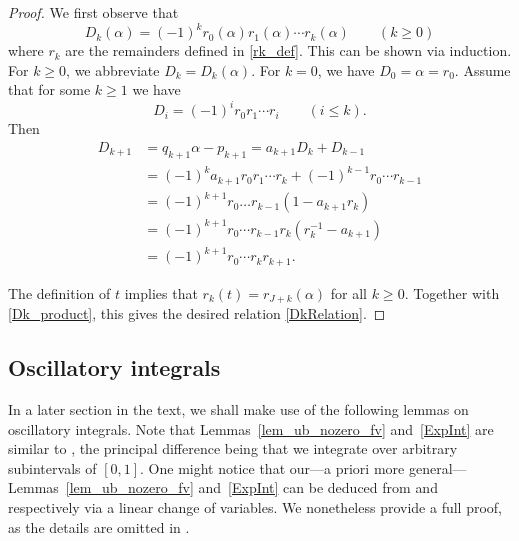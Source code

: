 \documentclass[12pt, reqno]{amsart}
\theoremstyle{definition}
\theoremstyle{remark}
\numberwithin{equation}{section}
\def\alp{{\alpha}} \def\bfalp{{\boldsymbol \alpha}}
\def\ls{\leqslant} \def\gs{\geqslant}
\begin{document}
\begin{proof}
We first observe that   
\begin{equation} \label{Dk_product}
D_k(\alp) = (-1)^k r_0(\alp) r_1(\alp) \cdots r_k(\alp) \qquad (k\gs 0)
\end{equation}
where $r_k$ are the remainders defined in \eqref{rk_def}. This can be shown via induction. For $k \ge 0$, we abbreviate $D_k = D_k(\alp)$. For $k=0$, we have $D_0 = \alp = r_0.$ Assume that for some $k\gs 1$ we have 
\[ 
D_i = (-1)^i r_0 r_1 \cdots r_i \qquad (i\ls k).   
\] 
Then 
\begin{align*}
D_{k+1} 
&= q_{k+1}\alp - p_{k+1} = a_{k+1}D_{k} + D_{k-1}
\\&= (-1)^ka_{k+1}r_0r_1\cdots r_k 
+ (-1)^{k-1}r_0\cdots r_{k-1} 
\\&= (-1)^{k+1} r_0\ldots r_{k-1}
(1- a_{k+1}r_k) 
\\ &= (-1)^{k+1} 
r_0\cdots r_{k-1}r_k(r_k^{-1}
- a_{k+1}) 
\\ &= (-1)^{k+1}
r_0\cdots r_k r_{k+1}.
\end{align*} 

The definition of $t$ implies that $r_k(t) = r_{J+k}(\alp)$ for all $k\gs 0.$  
Together with \eqref{Dk_product}, this gives the desired relation  \eqref{DkRelation}.
\end{proof}

\subsection{Oscillatory integrals} In a later section in the text, we shall make use of the following  lemmas on oscillatory integrals. Note that Lemmas~\ref{lem_ub_nozero_fv} and~\ref{ExpInt} are similar to  \cite[Lemmas~5.1 and~5.2]{QR2003},  the principal difference being that we integrate over arbitrary subintervals of $[0,1]$. One might notice that our---a priori more general---Lemmas~\ref{lem_ub_nozero_fv} and~\ref{ExpInt}   can be deduced from \cite[Lemma~5.1]{QR2003} and~\cite[Lemma~5.2]{QR2003} respectively via a linear change of variables. We nonetheless provide a full proof, as  the details are omitted in \cite{QR2003}.
\end{document}
